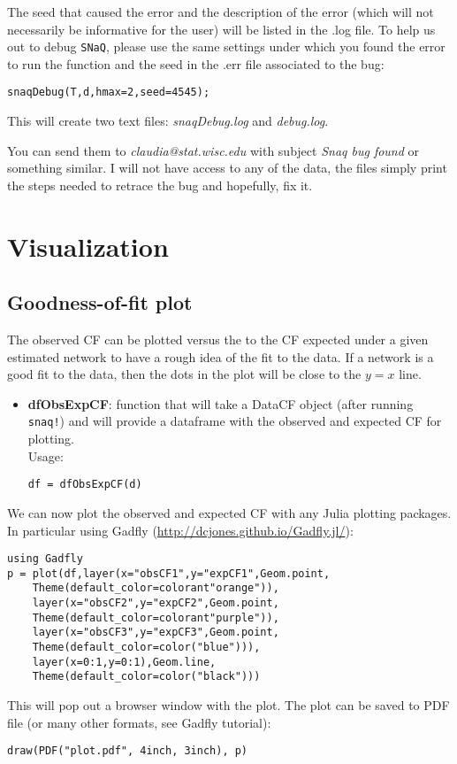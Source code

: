 \documentclass[12pt]{article}
\begin{document}
The seed that caused the error and the description of the error (which
will not necessarily be informative for the user) will be listed in
the .log file.  To help us out to debug \texttt{SNaQ}, please use the
same settings under which you found the error to run the function and
the seed in the .err file associated to the bug:
\begin{lstlisting}
snaqDebug(T,d,hmax=2,seed=4545);
\end{lstlisting}
This will create two text files: \textit{snaqDebug.log} and
\textit{debug.log}.

You can send them to \textit{claudia@stat.wisc.edu} with subject
\textit{Snaq bug found} or something similar. I will not have access
to any of the data, the files simply print the steps needed to retrace
the bug and hopefully, fix it.


\section{Visualization}

\subsection{Goodness-of-fit plot}
The observed CF can be plotted versus the to the CF expected under a
given estimated network to have a rough idea of the fit to the
data. If a network is a good fit to the data, then the dots in the
plot will be close to the $y=x$ line.
\begin{itemize}
\item{\textbf{dfObsExpCF}: function that will take a DataCF object
    (after running \texttt{snaq!}) and will provide a dataframe with
    the observed and expected CF for plotting.
\\Usage:
\begin{lstlisting}
df = dfObsExpCF(d)
\end{lstlisting}
}
\end{itemize}

We can now plot the observed and expected CF with any Julia plotting
packages. In particular using Gadfly (\url{http://dcjones.github.io/Gadfly.jl/}):
\begin{lstlisting}
using Gadfly
p = plot(df,layer(x="obsCF1",y="expCF1",Geom.point,
    Theme(default_color=colorant"orange")),
    layer(x="obsCF2",y="expCF2",Geom.point,
    Theme(default_color=colorant"purple")),
    layer(x="obsCF3",y="expCF3",Geom.point,
    Theme(default_color=color("blue"))),
    layer(x=0:1,y=0:1),Geom.line,
    Theme(default_color=color("black")))
\end{lstlisting}
This will pop out a browser window with the plot. The plot can be
saved to PDF file (or many other formats, see Gadfly tutorial):
\begin{lstlisting}
draw(PDF("plot.pdf", 4inch, 3inch), p)
\end{lstlisting}
\end{document}
